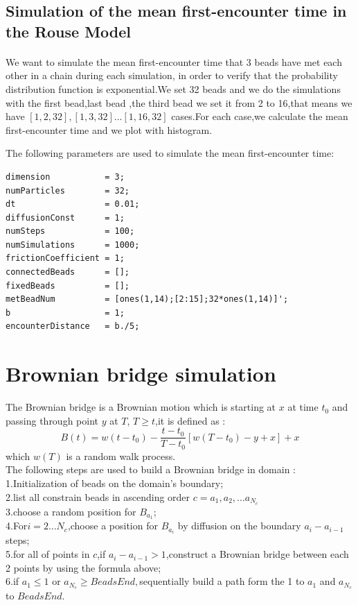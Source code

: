 \documentclass{article}
\begin{document}
\subsection{Simulation of the mean first-encounter time in the Rouse Model}
\paragraph{}
We want to simulate the mean first-encounter time that 3 beads have met each other in a chain during each simulation, in order to verify that the probability distribution function is exponential.We set 32 beads and we do the simulations with the first bead,last bead ,the third bead we set it from 2 to 16,that means we have $[1,2,32],[1,3,32]...[1,16,32]$ cases.For each case,we calculate the mean first-encounter time and we plot with histogram.

The following parameters are used to simulate the mean first-encounter time:
\pagebreak
\begin{lstlisting}
dimension           = 3;
numParticles        = 32;
dt                  = 0.01;
diffusionConst      = 1;
numSteps            = 100;
numSimulations      = 1000;
frictionCoefficient = 1;
connectedBeads      = [];
fixedBeads          = [];
metBeadNum          = [ones(1,14);[2:15];32*ones(1,14)]';
b                   = 1;
encounterDistance   = b./5;
\end{lstlisting}

\section{Brownian bridge simulation}
The Brownian bridge is a Brownian motion which is starting at $x$ at time $t_0$ and passing through point $y$ at $T$, $T \geq t$,it is defined as :\\
\begin{equation}
B(t) = w(t-t_0)-\frac{t-t_0}{T-t_0}[w(T-t_0)-y+x]+x
\end{equation}
which $w(T)$ is a random walk process.\\
The following steps are used to build a Brownian bridge in domain :\\
1.Initialization of beads on the domain's boundary;\\
2.list all constrain beads in ascending order $c={a_1,a_2,...a_{N_c}}$\\
3.choose a random position for $B_{a_1}$;\\
4.For$i =2...N_c$,choose a position for $B_{a_i}$ by diffusion on the boundary $a_i -a_{i-1}$ steps;\\
5.for all of points in $c$,if $a_{i}-a_{i-1}>1$,construct a Brownian bridge between each 2 points by using the formula above;\\
6.if $a_1 \leq 1$ or $a_{N_c} \geq BeadsEnd,$sequentially build a path form the 1 to $a_1$ and $a_{N_c}$ to $BeadsEnd$.\\
\end{document}
